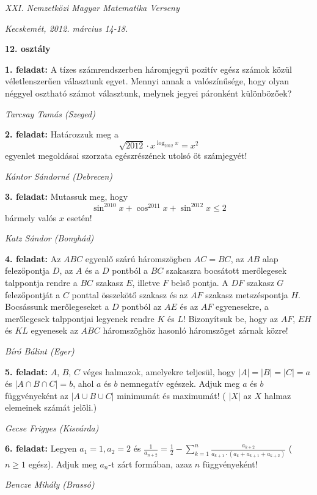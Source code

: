 \documentclass[a4paper,10pt]{article}
\def\ki#1#2{\hfill {\it #1 (#2)}\medskip}
\begin{document}
\begin{center} \Large {\em XXI. Nemzetközi Magyar Matematika Verseny} \end{center}
\begin{center} \large{\em Kecskemét, 2012. március 14-18.} \end{center}
\smallskip
\begin{center} \large{\bf 12. osztály} \end{center}
\bigskip 

{\bf 1. feladat: } A tízes számrendszerben háromjegyű pozitív egész számok közül véletlenszerűen választunk egyet. Mennyi annak a valószínűsége, hogy olyan néggyel osztható számot választunk, melynek jegyei páronként különbözőek?

\ki{Tarcsay Tamás}{Szeged}\medskip

{\bf 2. feladat: } Határozzuk meg a
$$ \sqrt{2012}\cdot x^{\log_{2012}x}=x^2$$
egyenlet megoldásai szorzata egészrészének utolsó öt számjegyét!

\ki{Kántor Sándorné}{Debrecen}\medskip

{\bf 3. feladat: } Mutassuk meg, hogy
$$\sin^{2010}x+\cos^{2011}x+\sin^{2012}x\le 2$$
bármely valós $x$ esetén!

\ki{Katz Sándor}{Bonyhád}\medskip

{\bf 4. feladat: } Az $ABC$ egyenlő szárú háromszögben $AC = BC$, 
az $AB$ alap felezőpontja $D$, az $A$ és a $D$ pontból
a $BC$ szakaszra bocsátott merőlegesek talppontja rendre a $BC$ szakasz $E$, illetve $F$ belső pontja. A $DF$ szakasz $G$ felezőpontját a $C$ ponttal összekötő szakasz és az $AF$ szakasz metszéspontja $H$.
Bocsássunk merőlegeseket a $D$ pontból az $AE$ és az $AF$ egyenesekre, a merőlegesek talppontjai
legyenek rendre $K$ és $L$! Bizonyítsuk be, hogy az $AF$, $EH$ és $KL$ egyenesek az $ABC$ háromszöghöz hasonló háromszöget zárnak közre!

\ki{Bíró Bálint}{Eger}\medskip

{\bf 5. feladat: } $A$, $B$, $C$ véges halmazok, amelyekre teljesül, 
hogy $|A|=|B|=|C|=a$ és $|A \cap B \cap C|=b$, ahol $a$ és
$b$ nemnegatív egészek. Adjuk meg $a$ és $b$ függvényeként az $|A \cup B \cup C|$ minimumát és maximumát! ( $|X|$ az $X$ halmaz elemeinek számát jelöli.)

\ki{Gecse Frigyes}{Kisvárda}\medskip

{\bf 6. feladat: } Legyen $a_1=1, a_2=2$ és
$\displaystyle{\frac{1}{a_{n+2}}
=\frac{1}{2}-\sum_{k=1}^{n}\frac{a_{k+2}}{a_{k+1}\cdot(a_k+a_{k+1}+a_{k+2})}}$
($n \ge 1$ egész). 
Adjuk meg $a_n$-t zárt formában, azaz $n$ függvényeként!

\ki{Bencze Mihály}{Brassó}\medskip




\vfill
\end{document}
